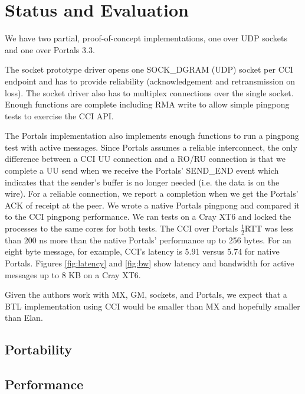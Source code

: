 
\section{Status and Evaluation}
We have two partial, proof-of-concept implementations, one over UDP sockets and
one over Portals 3.3.

The socket prototype driver opens one SOCK\_DGRAM (UDP) socket per CCI endpoint
and has to provide reliability (acknowledgement and retransmission on loss).
The socket driver also has to multiplex connections over the single socket.
Enough functions are complete including RMA write to allow simple pingpong
tests to exercise the CCI API.

The Portals implementation also implements enough functions to run a pingpong
test with active messages. Since Portals assumes a reliable interconnect, the
only difference between a CCI UU connection and a RO/RU connection is that we
complete a UU send when we receive the Portals' SEND\_END event which indicates
that the sender's buffer is no longer needed (i.e. the data is on the wire).
For a reliable connection, we report a completion when we get the Portals' ACK
of receipt at the peer. We wrote a native Portals pingpong and compared it to
the CCI pingpong performance. We ran tests on a Cray XT6 and locked the
processes to the same cores for both tests. The CCI over Portals
\begin{math}\frac{1}{2}\end{math}RTT was less than 200 ns more than the native
Portals' performance up to 256 bytes. For an eight byte message, for example,
CCI's latency is 5.91 \us versus 5.74 \us for native Portals. Figures
\ref{fig:latency} and \ref{fig:bw} show latency and bandwidth for active messages
up to 8 KB on a Cray XT6.

Given the authors work with MX, GM, sockets, and Portals, we expect that a BTL
implementation using CCI would be smaller than MX and hopefully smaller than
Elan.

\subsection{Portability}

\subsection{Performance}

